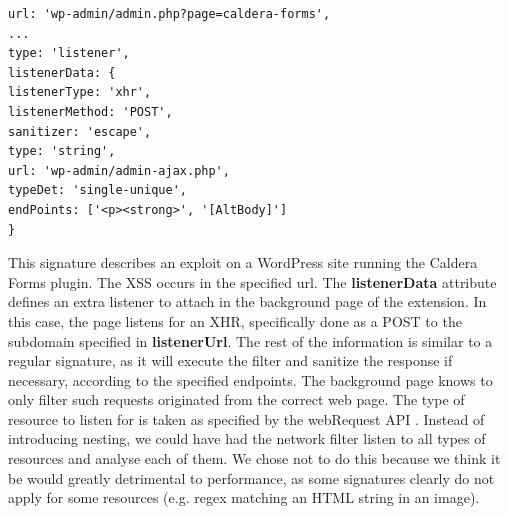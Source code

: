 \lstset{basicstyle=\small}
\begin{lstlisting}[breaklines=true,caption={A signature for a dynamic request},label={lst:dynamic_signature}]
url: 'wp-admin/admin.php?page=caldera-forms',
...
type: 'listener',
listenerData: {
listenerType: 'xhr',
listenerMethod: 'POST',
sanitizer: 'escape',
type: 'string',
url: 'wp-admin/admin-ajax.php',
typeDet: 'single-unique',
endPoints: ['<p><strong>', '[AltBody]']
}
\end{lstlisting}

This signature describes an exploit on a WordPress site running the Caldera Forms plugin. The XSS occurs in the specified url. The \textbf{listenerData} attribute defines an extra listener to attach in the background page of the extension. In this case, the page listens for an XHR, specifically done as a POST to the subdomain specified in \textbf{listenerUrl}. The rest of the information is similar to a regular signature, as it will execute the filter and sanitize the response if necessary, according to the specified endpoints. The background page knows to only filter such requests originated from the correct web page. The type of resource to listen for is taken as specified by the webRequest API \cite{webRequest}. Instead of introducing nesting, we could have had the network filter listen to all types of resources and analyse each of them. We chose not to do this because we think it be would greatly detrimental to performance, as some signatures clearly do not apply for some resources (e.g. regex matching an HTML string in an image).

